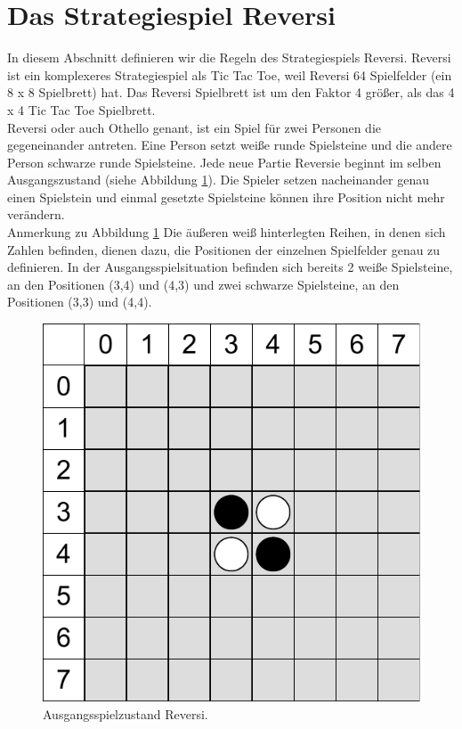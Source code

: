 \section{Das Strategiespiel Reversi}
\label{sec:Das Strategiespiel Reversi}
In diesem Abschnitt definieren wir die Regeln des Strategiespiels Reversi. Reversi ist ein komplexeres Strategiespiel als Tic Tac Toe, weil Reversi 64 Spielfelder (ein 8 x 8 Spielbrett) hat. Das Reversi Spielbrett ist um den Faktor 4 größer, als das 4 x 4 Tic Tac Toe Spielbrett. \\

Reversi oder auch Othello genant, ist ein Spiel für zwei Personen die gegeneinander antreten. Eine Person setzt weiße runde Spielsteine und die andere Person schwarze runde Spielsteine. Jede neue Partie Reversie beginnt im selben Ausgangszustand (siehe Abbildung \ref{fig:ausgangssituation_reversi}). Die Spieler setzen nacheinander genau einen Spielstein und einmal gesetzte Spielsteine können ihre Position nicht mehr verändern. \\

Anmerkung zu Abbildung \ref{fig:ausgangssituation_reversi}  Die äußeren weiß hinterlegten Reihen, in denen sich Zahlen befinden, dienen dazu, die Positionen der einzelnen Spielfelder genau zu definieren. In der Ausgangsspielsituation befinden sich bereits 2 weiße Spielsteine, an den Positionen (3,4) und (4,3) und zwei schwarze Spielsteine, an den Positionen (3,3) und (4,4). \\

\begin{figure}[!htbp]
  \centering
  \includegraphics[scale=0.5]{inhalt/abbildungen/ausgangssituation_reversi.pdf}
  \caption{Ausgangsspielzustand Reversi.}
  \label{fig:ausgangssituation_reversi}
\end{figure}

